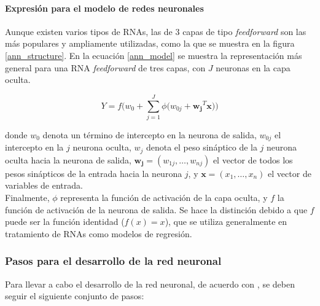 \paragraph{Expresión para el modelo de redes neuronales}
Aunque existen varios tipos de RNAs, las de 3 capas de tipo \textit{feedforward} son las más populares y ampliamente utilizadas, como la que se muestra en la figura \ref{ann_structure}. En la ecuación \ref{ann_model} se muestra la representación más general para una RNA \textit{feedforward} de tres capas, con $J$ neuronas en la capa oculta.

\begin{equation}
	Y = f \bigg ( w_0 + \sum_{j=1}^{J} \phi \big ( w_{0j} + \mathbf{w_j}^T \mathbf{x} \big )\bigg )
	\label{ann_model}
\end{equation}

donde $w_0$ denota un término de intercepto en la neurona de salida, $w_{0j}$ el intercepto en la $j$ neurona oculta, $w_j$ denota el peso sináptico de la $j$ neurona oculta hacia la neurona de salida, $\mathbf{w_j} = (w_{1j}, \ldots, w_{nj})$ el vector de todos los pesos sinápticos de la entrada hacia la neurona $j$, y $\mathbf{x} = (x_1, \ldots, x_n)$ el vector de variables de entrada.\\

Finalmente, $\phi$ representa la función de activación de la capa oculta, y $f$ la función de activación de la neurona de salida. Se hace la distinción debido a que $f$ puede ser la función identidad ($f(x) = x$), que se utiliza generalmente en tratamiento de RNAs como modelos de regresión.

\subsubsection{Pasos para el desarrollo de la red neuronal}
Para llevar a cabo el desarrollo de la red neuronal, de acuerdo con \textcite{sunythesis}, se deben seguir el siguiente conjunto de pasos:

